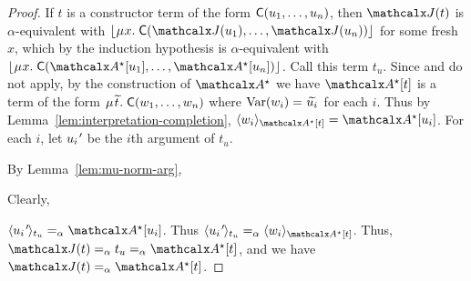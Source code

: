 \begin{proof}
If $t$ is a constructor term of the form $\textsf{C}( u_1, \ldots, u_n )$,
then $\interp{\J}{t}$ is $\alpha$-equivalent with $\nf{\MU x.\; \const{C}( \interp{\J}{u_1}, \ldots, \interp{\J}{u_n} ) }$ for some fresh $x$,
which by the induction hypothesis is $\alpha$-equivalent with $\nf{\MU x.\; \const{C}( \ValC \ec{ u_1 }, \ldots, \ValC \ec{ u_n } )}$.
Call this term $t_u$.
Since  and  do not apply, %
by the construction of $\ValC$ we have $\ValC \ec{t}$ is a term
of the form $\MU {\Varec{t}}.\; \const{C}( w_1, \ldots, w_n )$
where
$\muvar(w_i) = {\Varec{u_i}}$ for each $i$.  Thus by Lemma~\ref{lem:interpretation-completion},
$\expand{\ValC \ec{t}}{w_i} = \ValC \ec{u_i}$.
For each $i$, let $u_\iPrime$ be the $i$\vvthinspace th argument of $t_u$.
\begin{rep}By Lemma~\ref{lem:mu-norm-arg},\end{rep}%
\begin{conf}Clearly,\end{conf} %
$\expand{t_u}{u_\iPrime} \vsim \ValC \ec{u_i}$.
Thus $\expand{t_u}{u_\iPrime} \vsim \expand{\ValC \ec{t}}{ w_i }$. %
Thus, $\interp{\J}{t} \vsim t_u \vsim \ValC \ec{t}$, and
we have $\interp{\J}{t} \vsim \ValC \ec{t}$.


\end{proof}
